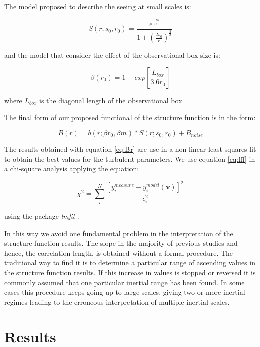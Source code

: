 \documentclass[fleqn,usenatbib, useAMS, a4paper]{mnras}
\begin{document}
The model proposed to describe the seeing at small scales is:

\begin{equation}\label{eq:ffs}
S(r; s_0, r_0) = \frac{e^\frac{-s_0}{r_0}}{1+(\frac{2s_0}{r})^\frac{2}{3}}
\end{equation}

and the model that consider the effect of the observational box size is:

\begin{equation}\label{eq:ffb}
\beta(r_0) = 1 - exp[\frac{L_{box}}{3.6r_0}] 
\end{equation}

where $L_{box}$ is the diagonal length of the observational box.

The final form of our proposed functional of the structure function is in the form:

\begin{equation}\label{eq:fff}
B(r) = b(r; \beta r_0, \beta m)*S(r; s_0, r_0)+B_{noise}
\end{equation}

The results obtained with equation \ref{eq:Br} are use in a non-linear least-squares
fit to obtain the best values for the turbulent parameters. 
We use equation \ref{eq:fff} in a chi-square analysis applying the equation:

\begin{equation}\label{eq:chi}
\chi^2 = \sum_i ^N \frac{[y_i^{measure}-y_i^{model} (\boldsymbol{v})]^2}{\epsilon_i ^2}
\end{equation}

using the package \textit{lmfit} \citep{newville_matthew_2014_11813}. 

In this way we avoid one fundamental problem in the interpretation of the structure function results. 
The slope in the majority of previous studies and hence, the correlation length, is obtained without a formal procedure. 
The traditional way to find it is to determine a particular range of ascending values in the structure function results. 
If this increase in values is stopped or reversed it is commonly assumed that one particular inertial range has been found. 
In some cases this procedure keeps going up to large scales, giving two or more inertial regimes leading to the erroneous interpretation of multiple inertial scales.


\section{Results}\label{sec:results}
\end{document}
